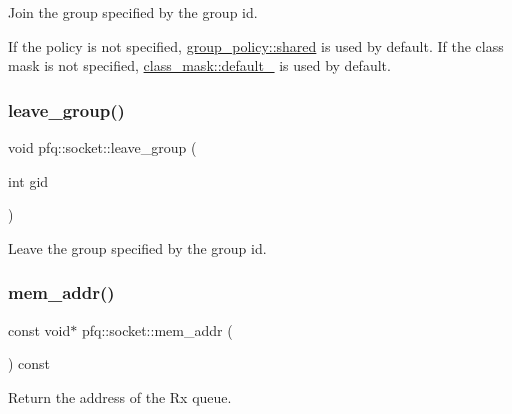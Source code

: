 Join the group specified by the group id. 

If the policy is not specified, \hyperlink{namespacepfq_ac41249c8510558905b01fa4d866a38d7a9e81e7b963c71363e2fb3eefcfecfc0e}{group\+\_\+policy\+::shared} is used by default. If the class mask is not specified, \hyperlink{namespacepfq_a96af1f5ed530eff563eb917516758fbba172b03053216c6158fe380805998ad6c}{class\+\_\+mask\+::default\+\_\+} is used by default. \mbox{\label{classpfq_1_1socket_ac512d6b89db52da73a51ba9112658180}} 
\subsubsection{\texorpdfstring{leave\+\_\+group()}{leave\_group()}}
{\footnotesize\ttfamily void pfq\+::socket\+::leave\+\_\+group (\begin{DoxyParamCaption}\item[{int}]{gid }\end{DoxyParamCaption})\hspace{0.3cm}{\ttfamily [inline]}}



Leave the group specified by the group id. 

\mbox{\label{classpfq_1_1socket_aac25000416bf154eb0e3d632e051a202}} 
\subsubsection{\texorpdfstring{mem\+\_\+addr()}{mem\_addr()}}
{\footnotesize\ttfamily const void$\ast$ pfq\+::socket\+::mem\+\_\+addr (\begin{DoxyParamCaption}{ }\end{DoxyParamCaption}) const\hspace{0.3cm}{\ttfamily [inline]}}



Return the address of the Rx queue. 

\mbox{\label{classpfq_1_1socket_af4e748efa70a0b0c80eb5abf6a0d0277}} 
